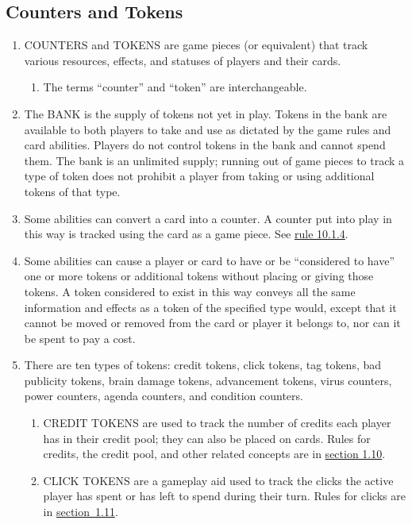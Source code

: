 \subsection{Counters and Tokens}
\begin{enumerate}
	\item COUNTERS and TOKENS are game pieces (or equivalent) that track various resources, effects, and statuses of players and their cards.
	      \begin{enumerate}
		      \item The terms ``counter'' and ``token'' are interchangeable.
	      \end{enumerate}
	\item The BANK is the supply of tokens not yet in play. Tokens in the bank are available to both players to take and use as dictated by the game rules and card abilities. Players do not control tokens in the bank and cannot spend them. The bank is an unlimited supply; running out of game pieces to track a type of token does not prohibit a player from taking or using additional tokens of that type.
	\item Some abilities can convert a card into a counter. A counter put into play in this way is tracked using the card as a game piece. See \hyperlink{page.i}{rule 10.1.4}.
	\item Some abilities can cause a player or card to have or be ``considered to have'' one or more tokens or additional tokens without placing or giving those tokens. A token considered to exist in this way conveys all the same information and effects as a token of the specified type would, except that it cannot be moved or removed from the card or player it belongs to, nor can it be spent to pay a cost.
	\item There are ten types of tokens: credit tokens, click tokens, tag tokens, bad publicity tokens, brain damage tokens, advancement tokens, virus counters, power counters, agenda counters, and condition counters.
	      \begin{enumerate}
		      \item CREDIT TOKENS are used to track the number of credits each player has in their credit pool; they can also be placed on cards. Rules for credits, the credit pool, and	other related concepts are in \hyperlink{page.i}{section 1.10}.
		      \item  CLICK TOKENS are a gameplay aid used to track the clicks the active player has spent or has left to spend during their turn. Rules for clicks are in \hyperlink{page.i}{section~1.11}.

\end{enumerate}
\end{enumerate}
